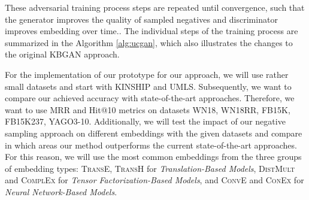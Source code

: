 These adversarial training process steps are repeated until convergence, such that the generator improves the quality of sampled negatives and discriminator improves embedding over time.. 
The individual steps of the training process are summarized in the Algorithm \ref{alg:ucgan}, which also illustrates the changes to the original \ac{KBGAN} approach.



% 



For the implementation of our prototype for our approach, we will use rather small datasets and start with \textsc{KINSHIP} and \textsc{UMLS}.
Subsequently, we want to compare our achieved accuracy with state-of-the-art approaches.
Therefore, we want to use \ac{MRR} and Hit@10 metrics on datasets \textsc{WN18}, \textsc{WN18RR}, \textsc{FB15K}, \textsc{FB15K237}, \textsc{YAGO3-10}.
Additionally, we will test the impact of our negative sampling approach on different embeddings with the given datasets and compare in which areas our method outperforms the current state-of-the-art approaches.
For this reason, we will use the most common embeddings from the three groups of embedding types:
\textsc{TransE}, \textsc{TransH} for \textit{Translation-Based Models}, \textsc{DistMult} and \textsc{ComplEx} for \textit{Tensor Factorization-Based Models}, and \textsc{ConvE} and \textsc{ConEx} for \textit{Neural Network-Based Models}.





